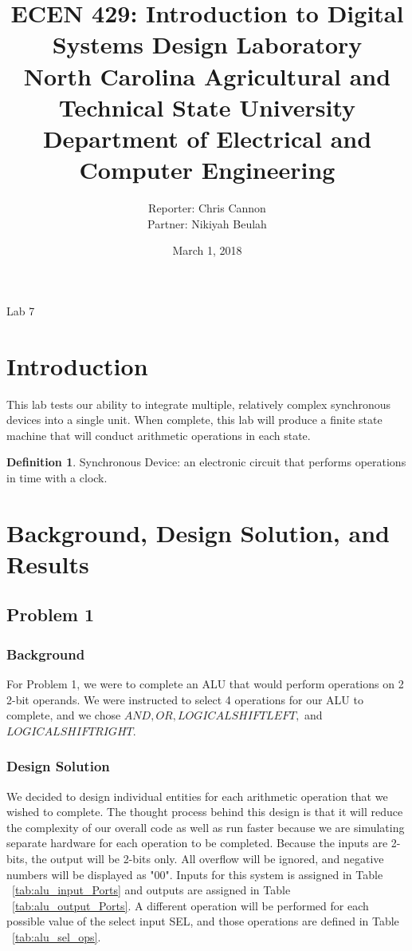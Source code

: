 \documentclass[11pt]{article}
\title {{\titleFont ECEN 429: Introduction to Digital Systems Design Laboratory \\ North Carolina Agricultural and Technical State University \\ Department of Electrical and Computer Engineering}} %
\author{\titleFont Reporter: Chris Cannon\\ \titleFont Partner: Nikiyah Beulah} %
\date{\titleFont March 1, 2018}
\begin{document}
\begin{titlingpage}
\maketitle
\begin{center}
	Lab 7
\end{center}
\end{titlingpage}

\section{Introduction}
This lab tests our ability to integrate multiple, relatively complex synchronous devices into a single unit. When complete, this lab will produce a finite state machine that will conduct arithmetic operations in each state.

\theoremstyle{definition}
\newtheorem{definition}{Definition}
\begin{definition}
Synchronous Device: an electronic circuit that performs operations in time with a clock.
\label{def:synchronous_device}
\end{definition}

\section{Background, Design Solution, and Results}

\subsection{Problem 1 }

\subsubsection{Background}
For Problem 1, we were to complete an ALU that would perform operations on 2 2-bit operands. We were instructed to select 4 operations for our ALU to complete, and we chose $AND, OR, LOGICAL SHIFT LEFT,$ and $LOGICAL SHIFT RIGHT$.

\subsubsection{Design Solution}
We decided to design individual entities for each arithmetic operation that we wished to complete. The thought process behind this design is that it will reduce the complexity of our overall code as well as run faster because we are simulating separate hardware for each operation to be completed. Because the inputs are 2-bits, the output will be 2-bits only. All overflow will be ignored, and negative numbers will be displayed as "00". Inputs for this system is assigned in Table ~\ref{tab:alu_input_Ports} and outputs are assigned in Table ~\ref{tab:alu_output_Ports}. A different operation will be performed for each possible value of the select input SEL, and those operations are defined in Table ~\ref{tab:alu_sel_ops}.
\end{document}
